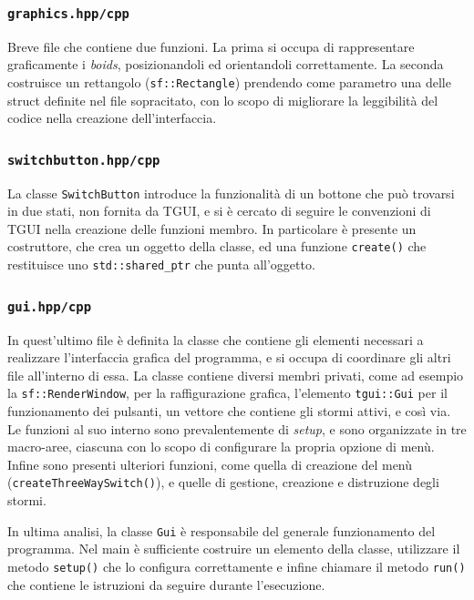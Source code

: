\documentclass[10pt,a4paper]{article}
\begin{document}
\subsubsection{\texttt{graphics.hpp/cpp}}

Breve file che contiene due funzioni. La prima si occupa di rappresentare graficamente i \textit{boids}, posizionandoli ed orientandoli correttamente. La seconda costruisce un rettangolo (\texttt{sf::Rectangle}) prendendo come parametro una delle struct definite nel file sopracitato, con lo scopo di migliorare la leggibilità del codice nella creazione dell'interfaccia.

\subsubsection{\texttt{switchbutton.hpp/cpp}}

La classe \texttt{SwitchButton} introduce la funzionalità di un bottone che può trovarsi in due stati, non fornita da TGUI, e si è cercato di seguire le convenzioni di TGUI nella creazione delle funzioni membro. In particolare è presente un costruttore, che crea un oggetto della classe, ed una funzione \texttt{create()} che restituisce uno \texttt{std::shared\_ptr} che punta all'oggetto.

\subsubsection{\texttt{gui.hpp/cpp}}

In quest'ultimo file è definita la classe che contiene gli elementi necessari a realizzare l'interfaccia grafica del programma, e si occupa di coordinare gli altri file all'interno di essa. La classe contiene diversi membri privati, come ad esempio la \texttt{sf::RenderWindow}, per la raffigurazione grafica, l'elemento \texttt{tgui::Gui} per il funzionamento dei pulsanti, un vettore che contiene gli stormi attivi, e così via. Le funzioni al suo interno sono prevalentemente di \textit{setup}, e sono organizzate in tre macro-aree, ciascuna con lo scopo di configurare la propria opzione di menù. Infine sono presenti ulteriori funzioni, come quella di creazione del menù (\texttt{createThreeWaySwitch()}), e quelle di gestione, creazione e distruzione degli stormi.

In ultima analisi, la classe \texttt{Gui} è responsabile del generale funzionamento del programma. Nel main è sufficiente costruire un elemento della classe, utilizzare il metodo \texttt{setup()} che lo configura correttamente e infine chiamare il metodo \texttt{run()} che contiene le istruzioni da seguire durante l'esecuzione.
\end{document}

